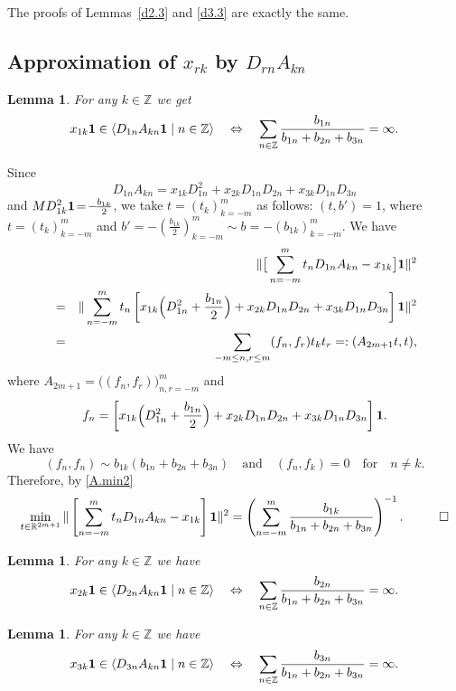\documentclass[preprint,12pt]{elsarticle}
\newcommand{\commA}[1]{\marginpar{%
\begin{color}{red}
\vskip-\baselineskip %
\raggedright\footnotesize
\itshape\hrule \smallskip A: #1\par\smallskip\hrule\end{color}}}
\newtheorem{lem}[thm]{Lemma}
\numberwithin{equation}{section}
\begin{document}
The proofs of  Lemmas~\ref{d2.3} and \ref{d3.3} are exactly the same.






\subsection{Approximation of $x_{rk}$ by $D_{rn}A_{kn}$}
\begin{lem}
\label{x1,dA.m=3}
 For any  $k\in {\mathbb Z}$ we get
 $$
 x_{1k}{\bf 1}\in\langle D_{1n}A_{kn}{\bf 1}\mid n\in{\mathbb Z}\rangle
 \quad\Leftrightarrow\quad
\sum_{n\in{\mathbb Z}}\frac{b_{1n}}{b_{1n}+b_{2n}+b_{3n}}=\infty.
$$
\end{lem}
\begin{pf} Since
$$
D_{1n}A_{kn}=x_{1k}D_{1n}^2+x_{2k}D_{1n}D_{2n}+x_{3k}D_{1n}D_{3n}
$$
and $MD_{1k}^2{\bf 1}\!=\!-\!\frac{b_{1k}}{2}$, we take $t\!=\!(t_k)_{k=-m}^m$ as follows:
$
(t,b')=1$, where $t=(t_k)_{k=-m}^m$ and $b'=-(\frac{b_{1k}}{2})_{k=-m}^m\sim b=-(b_{1k})_{k=-m}^m$. 
We have
\begin{eqnarray*}
&&\Vert \big[\sum_{n=-m}^mt_nD_{1n}A_{kn}-x_{1k}\big]{\bf
1}\Vert^2\\
&=&\Vert \sum_{n=-m}^mt_n
\left[x_{1k}\Big(D_{1n}^2+\frac{b_{1n}}{2}\Big)+x_{2k}D_{1n}D_{2n}+x_{3k}D_{1n}D_{3n}\right]{\bf 1}
\Vert^2\\
&=&\sum_{-m\leq n,r\leq m}(f_n,f_r)t_kt_r=:(A_{2m+1}t,t),
\end{eqnarray*}
where $A_{2m+1}=\big((f_n,f_r)\big)_{n,r=-m}^m$
and
$$
f_n=\left[x_{1k}\Big(D_{1n}^2+\frac{b_{1n}}{2}\Big)+x_{2k}D_{1n}D_{2n}+x_{3k}D_{1n}D_{3n}\right]{\bf 1}.
$$
We have
\begin{equation*}
(f_n,f_n)\sim b_{1k}(b_{1n}+b_{2n}+b_{3n}) \quad\text{and}\quad (f_n,f_k)=0\quad\text{for}\quad n\not=k.
\end{equation*}
Therefore, by \eqref{A.min2}
$$
\min_{t\in \mathbb R^{2m+1}}\Vert \left[\sum_{n=-m}^mt_nD_{1n}A_{kn}-x_{1k}\right]{\bf
1}\Vert^2=\left(\sum_{n=-m}^m\frac{b_{1k}}{b_{1n}+b_{2n}+b_{3n}}\right)^{-1}.\hskip 1cm\Box
$$
\end{pf}
\begin{lem}
\label{x2,dA.m=3}
 For any  $k\in {\mathbb Z}$ we have
 $$
 x_{2k}{\bf 1}\in\langle D_{2n}A_{kn}{\bf 1}\mid n\in{\mathbb Z}\rangle
 \quad\Leftrightarrow\quad
\sum_{n\in{\mathbb Z}}\frac{b_{2n}}{b_{1n}+b_{2n}+b_{3n}}=\infty.
$$
\end{lem}
\begin{lem}
\label{x3,dA.m=3}
 For any  $k\in {\mathbb Z}$ we have
 $$
 x_{3k}{\bf 1}\in\langle D_{3n}A_{kn}{\bf 1}\mid n\in{\mathbb Z}\rangle
 \quad\Leftrightarrow\quad
\sum_{n\in{\mathbb Z}}\frac{b_{3n}}{b_{1n}+b_{2n}+b_{3n}}=\infty.
$$
\end{lem}
\end{document}
